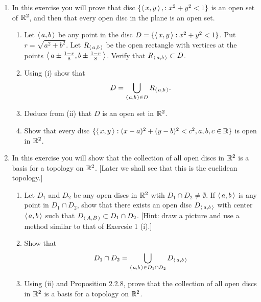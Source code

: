 \documentclass[10pt,a4paper]{report}
\begin{document}
\begin{enumerate}

\item In this exercise you will prove that disc $\{\left \langle\, x,y \,\right \rangle, : x^2+y^2< 1\}$ is an open set of $\mathbb{R}^2$, and then that every open disc in the plane is an open set.

\begin{enumerate}[label=(\roman*)]

	\item Let $\left \langle\, a,b \,\right \rangle$ be any point in the disc $D = \{\left \langle\, x,y \,\right \rangle : x^2+y^2 < 1\}$.  Put $r=\sqrt{a^2+b^2}$.  Let $R_{\left \langle\, a,b \,\right \rangle}$ be the open rectangle with vertices at the points $\left \langle\, a\pm \frac{1-r}{8}, b\pm \frac{1-r}{8} \,\right \rangle$.  Verify that $R_{\left \langle\, a,b \,\right \rangle} \subset D$.
	
	\item Using (i) show that \[ D = \bigcup_{\left \langle\, a,b \,\right \rangle\in D} R_{\left \langle\, a,b \,\right \rangle}. \]
	
	\item Deduce from (ii) that $D$ is an open set in $\mathbb{R}^2$.
	
	\item Show that every disc $\{\left \langle\, x,y \,\right \rangle:(x-a)^2+(y-b)^2<c^2,a,b,c \in \mathbb{R}\}$ is open in $\mathbb{R}^2$.

\end{enumerate}

\item In this exercise you will show that the collection of all open discs in $\mathbb{R}^2$ is a basis for a topology on $\mathbb{R}^2$. [Later we shall see that this is the euclidean topology.]

\begin{enumerate}[label=(\roman*)]

	\item Let $D_1$ and $D_2$ be any open discs in $\mathbb{R}^2$  wtih $D_1 \cap D_2 \ne \emptyset$.  If $\left \langle\, a,b \,\right \rangle$ is any point in $D_1 \cap D_2$, show that there exists an open disc $D_{\left \langle\, a,b \,\right \rangle}$ with center $\left \langle\, a,b \,\right \rangle$ such that $D_{\left \langle\, A,B \,\right \rangle} \subset D_1 \cap D_2$. [Hint: draw a picture and use a method similar to that of Exercsie 1 (i).]
	
	\item Show that \[ D_1 \cap D_2 = \bigcup_{\left \langle\, a,b \,\right \rangle\in D_1 \cap D_2} D_{\left \langle\, a,b \,\right \rangle} \]
	
	\item Using (ii) and Proposition 2.2.8, prove that the collection of all open discs in $\mathbb{R}^2$ is a basis for a topology on $\mathbb{R}^2$.


\end{enumerate}
\end{enumerate}
\end{document}
